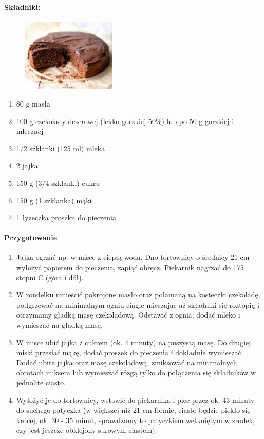 \documentclass{article}
\begin{document}
    \paragraph{Składniki:}
    \begin{figure}
        \includegraphics[width=0.4\textwidth]{ciasto_czekoladowe.jpg}
    \end{figure}
    \begin{enumerate}
        \item 80 g masła
        \item 100 g czekolady deserowej (lekko gorzkiej 50\%) lub po 50 g
            gorzkiej i mlecznej
        \item 1/2 szklanki (125 ml) mleka
        \item 2 jajka
        \item 150 g (3/4 szklanki) cukru
        \item 150 g (1 szklanka) mąki
        \item 1 łyżeczka proszku do pieczenia
    \end{enumerate}

    \paragraph{Przygotowanie}
    \begin{enumerate}
        \item Jajka ogrzać np. w misce z ciepłą wodą. Dno tortownicy o średnicy
            21 cm wyłożyć papierem do pieczenia, zapiąć obręcz. Piekarnik
            nagrzać do 175 stopni C (góra i dół).
        \item W rondelku umieścić pokrojone masło oraz połamaną na kosteczki
            czekoladę, podgrzewać na minimalnym ogniu ciągle mieszając aż
            składniki się roztopią i otrzymamy gładką masę czekoladową. Odstawić
            z ognia, dodać mleko i wymieszać na gładką masę.
        \item W misce ubić jajka z cukrem (ok. 4 minuty) na puszystą masę. Do
            drugiej miski przesiać mąkę, dodać proszek do pieczenia i dokładnie
            wymieszać. Dodać ubite jajka oraz masę czekoladową, zmiksować na
            minimalnych obrotach miksera lub wymieszać rózgą tylko do połączenia
            się składników w jednolite ciasto.
        \item Wyłożyć je do tortownicy, wstawić do piekarnika i piec przez ok.
            43 minuty do suchego patyczka (w większej niż 21 cm formie, ciasto
            będzie piekło się krócej, ok. 30 - 35 minut, sprawdzamy to
            patyczkiem wetkniętym w środek, czy jest jeszcze obklejony surowym
            ciastem).
    \end{enumerate}
    \newpage
\end{document}

